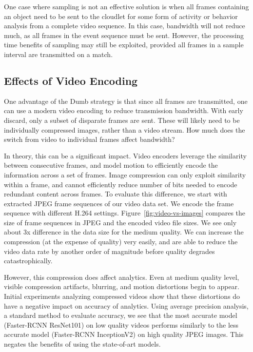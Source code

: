 One case where sampling is not an effective solution is when all frames
containing an object need to be sent to the cloudlet for some form of activity
or behavior analysis from a complete video sequence.  In this case, bandwidth
will not reduce much, as all frames in the event sequence must be sent.
However, the processing time benefits of sampling may still be exploited,
provided all frames in a sample interval are transmitted on a match.  


\subsection{Effects of Video Encoding}

One advantage of the {\xc Dumb} strategy is that since all
frames are transmitted, one can use a modern video encoding to
reduce transmission bandwidth.  With early discard, only a subset
of disparate frames are sent.  These will likely need to be
individually compressed images, rather than a video stream.  How
much does the switch from video to individual frames affect
bandwidth?  

In theory, this can be a significant impact. Video encoders leverage the
similarity between consecutive frames, and model motion to efficiently encode
the information across a set of frames. Image compression can only exploit
similarity within a frame, and cannot efficiently reduce number of bits needed
to encode redundant content across frames. To evaluate this difference, we start
with extracted JPEG frame sequences of our video data set. We encode the frame
sequence with different H.264 settings. Figure~\ref{fig:video-vs-images}
compares the size of frame sequences in JPEG and the encoded video file sizes.
We see only about 3x difference in the data size for the medium quality. We can
increase the compression (at the expense of quality) very easily, and are able
to reduce the video data rate by another order of magnitude before quality
degrades catastrophically.

However, this compression does affect analytics. Even at medium quality level,
visible compression artifacts, blurring, and motion distortions begin to appear.
Initial experiments analyzing compressed videos show that these distortions do
have a negative impact on accuracy of analytics. Using average precision
analysis, a standard method to evaluate accuracy, we see that the 
most accurate model (Faster-RCNN ResNet101) on low quality videos performs similarly
to the less accurate model (Faster-RCNN InceptionV2) on high quality
JPEG images. This negates the benefits of using the state-of-art models.

